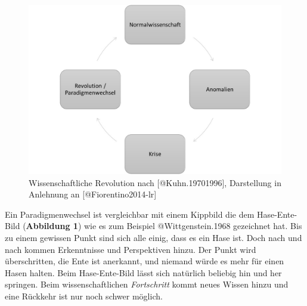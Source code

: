 \documentclass[
  letterpaper,
  DIV=11,
  numbers=noendperiod]{scrreprt}
\begin{document}
\begin{figure}[H]

{\centering \includegraphics{images/paradigmenwechsel.jpg}

}

\caption{Wissenschaftliche Revolution nach {[}@Kuhn.19701996{]},
Darstellung in Anlehnung an {[}@Fiorentino2014-lr{]}}

\end{figure}%

Ein Paradigmenwechsel ist vergleichbar mit einem Kippbild die dem
Hase-Ente-Bild (\textbf{Abbildung 1}) wie es zum Beispiel
@Wittgenstein.1968 gezeichnet hat. Bis zu einem gewissen Punkt sind sich
alle einig, dass es ein Hase ist. Doch nach und nach kommen Erkenntnisse
und Perspektiven hinzu. Der Punkt wird überschritten, die Ente ist
anerkannt, und niemand würde es mehr für einen Hasen halten. Beim
Hase-Ente-Bild lässt sich natürlich beliebig hin und her springen. Beim
wissenschaftlichen \emph{Fortschritt} kommt neues Wissen hinzu und eine
Rückkehr ist nur noch schwer möglich.
\end{document}
